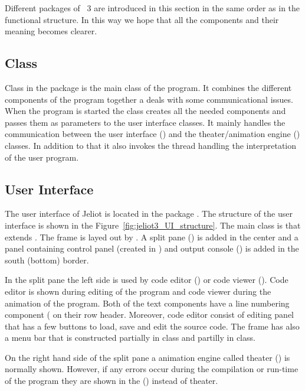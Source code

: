 Different packages of \jel{}~3 are introduced in this section in
the same order as in the functional structure. In this way we
hope that all the components and their meaning becomes clearer.

\subsection{\jel{} Class}
\label{sec:Jeliot_Class}

Class \jel{} in the package  is the main class of the program.
It combines the different components of the program together a deals with
some communicational issues. When the program is started the class creates
all the needed components and passes them as parameters to the user interface
classes. It mainly handles the communication between the user interface
() and the theater/animation engine () classes.
In addition to that it also invokes the thread handling the interpretation
of the user program.

\subsection{User Interface}
\label{sec:User_Interface}

The user interface of Jeliot is located in the package .
The structure of the user interface is shown in the
Figure~\ref{fig:jeliot3_UI_structure}. The main
class is  that extends . The frame is layed out
by . A split pane () is added in the center and
a panel containing control panel (created in ) and output console
() is added in the south (bottom) border.

In the split pane the left side is used by code editor () or code viewer
(). Code editor is shown during editing of the program
and code viewer during the animation of the program. Both of the text components
have a line numbering component ( on their row header. Moreover,
code editor consist of editing panel that has a few buttons to load, save and
edit the source code. The frame has also a menu bar that is constructed
partially in  class and partilly in  class.

On the right hand side of the split pane a animation engine called
theater () is normally shown. However, if any errors occur
during the compilation or run-time of the program they are shown
in the  () instead of theater.

